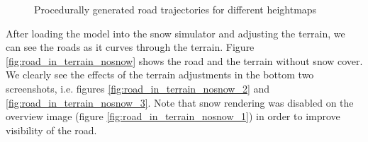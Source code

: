\begin{figure}[ht]
\caption{Procedurally generated road trajectories for different heightmaps}
\label{fig:road_trajectory}
\end{figure}

After loading the model into the snow simulator and adjusting the terrain, we can see the roads as it curves through the terrain. Figure \ref{fig:road_in_terrain_nosnow} shows the road and the terrain without snow cover. We clearly see the effects of the terrain adjustments in the bottom two screenshots, i.e. figures \ref{fig:road_in_terrain_nosnow_2} and \ref{fig:road_in_terrain_nosnow_3}. Note that snow rendering was disabled on the overview image (figure \ref{fig:road_in_terrain_nosnow_1}) in order to improve visibility of the road.

